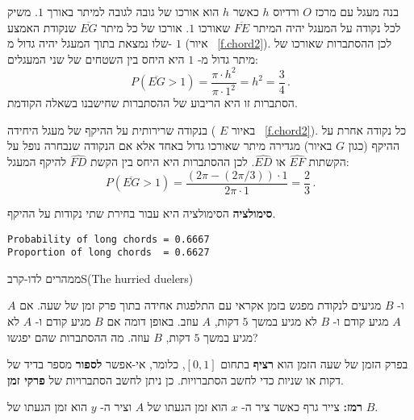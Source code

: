 בנה מעגל עם מרכז
$O$
ורדיוס 
$h$
כאשר 
$h$
הוא אורכו של גובה לגובה למיתר באורך 
$1$.
משיק לכל נקודה על המעגל יהיה המיתר
$\overline{FE}$
שאורכו 
$1$.
אורכו של כל מיתר
$\overline{EG}$
שנקודת האמצע שלו נמצאת בתוך המעגל יהיה גדול מ-%
$1$
(איור%
~\ref{f.chord2}).
לכן ההסתברות שאורכו של מיתר גדול מ-%
$1$
היא היחס בין השטחים של שני המעגלים:
\[
P(\overline{EG}>1)=\frac{\pi \cdot h^2}{\pi \cdot 1^2}=h^2=\frac{3}{4}\,.
\]
הסתברות זו היא הריבוע של ההסתברות שחישבנו בשאלה הקודמת.

בנקודה שרירותית על ההיקף של מעגל היחידה (%
$E$
באיור%
~\ref{f.chord2}).
כל נקודה אחרת על ההיקף (כגון 
$G$
באיור) מגדירה מיתר שאורכו גדול באחד אלא אם הנקודה שנבחרה נופל על הקשתות
$\widehat{EF}$
או
$\widehat{ED}$.
לכן ההסתברות היא היחס בין הקשת
$\widehat{FD}$
להיקף המעגל:
\[
P(\overline{EG}>1)=\frac{(2\pi-(2\pi/3))\cdot 1}{2\pi \cdot 1}=\frac{2}{3}\,.
\]

\textbf{סימולציה}
הסימולציה היא עבור בחירת שתי נקודות על ההיקף.
\begin{verbatim}
Probability of long chords = 0.6667
Proportion of long chords  = 0.6627
\end{verbatim}


\begin{prob}{ממהרים לדו-קרב}{S}{(The hurried duelers)}

$A$
ו-%
$B$
מגיעים לנקודת מפגש בזמן אקראי עם התלפגות אחידה בתוך פרק זמן של שעה. אם 
$A$
מגיע קודם ו-%
$B$
לא מגיע במשך 
$5$
דקות, 
$A$
עוזב. באופן דומה אם 
$B$
מגיע קודם ו-%
$A$
לא מגיע במשך 
$5$
דקות,
$B$
עוזה. מה ההסתברות שהם יפגשו?

בפרק הזמן של שעה הזמן הוא
\textbf{רציף}
בתחום
$[0,1]$,
כלומר,
אי-אפשר 
\textbf{לספור}
מספר בדיד של דקות או שניות כדי לחשב הסתברויות. כן ניתן לחשב הסתברויות של 
\textbf{פרקי זמן}.

\textbf{רמז:}
צייר גרף כאשר ציר ה-%
$x$
הוא זמן הגעתו של
$A$
וציר ה-%
$y$
הוא זמן הגעתו של 
$B$.
\end{prob}
\solution{}

